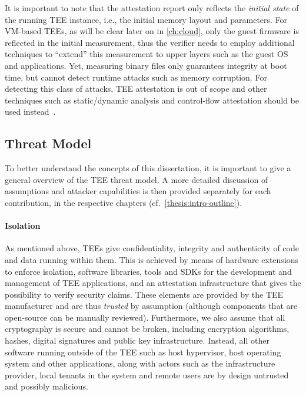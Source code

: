 It is important to note that the attestation report only reflects the
\emph{initial state} of the running \ac{TEE} instance, i.e., the initial memory
layout and parameters. For \acs{VM}-based \acp{TEE}, as will be clear later on
in \cref{ch:cloud}, only the guest firmware is reflected in the initial
measurement, thus the verifier needs to employ additional techniques to
``extend'' this measurement to upper layers such as the guest OS and
applications. Yet, measuring binary files only guarantees integrity at boot
time, but cannot detect runtime attacks such as memory corruption. For detecting
this class of attacks, \ac{TEE} attestation is out of scope and other techniques
such as static/dynamic analysis and control-flow attestation should be used
instead~\cite{alder2024pandora,sha2024control}.

\subsection{Threat Model}
\label{thesis:intro-threat}

To better understand the concepts of this dissertation, it is important to give
a general overview of the \ac{TEE} threat model. A more detailed discussion of
assumptions and attacker capabilities is then provided separately for each
contribution, in the respective chapters (cf.~\cref{thesis:intro-outline}).

\paragraph{Isolation}

As mentioned above, \acp{TEE} give confidentiality, integrity and authenticity
of code and data running within them. This is achieved by means of hardware
extensions to enforce isolation, software libraries, tools and \acp{SDK} for the
development and management of \ac{TEE} applications, and an attestation
infrastructure that gives the possibility to verify security claims. These
elements are provided by the \ac{TEE} manufacturer and are thus \emph{trusted}
by assumption (although components that are open-source can be manually
reviewed). Furthermore, we also assume that all cryptography is secure and
cannot be broken, including encryption algorithms, hashes, digital signatures
and public key infrastructure. Instead, all other software running outside of
the \ac{TEE} such as host hypervisor, host operating system and other
applications, along with actors such as the infrastructure provider, local
tenants in the system and remote users are by design untrusted and possibly
malicious. 

